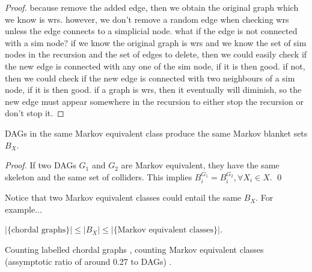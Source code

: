 \begin{proof}
because remove the added edge, then we obtain the original graph which we know is wrs. however, we don't remove a random edge when checking wrs unless the edge connects to a simplicial node. what if the edge is not connected with a sim node? if we know the original graph is wrs and we know the set of sim nodes in the recursion and the set of edges to delete, then we could easily check if the new edge is connected with any one of the sim node, if it is then good. if not, then we could check if the new edge is connected with two neighbours of a sim node, if it is then good. if a graph is wrs, then it eventually will diminish, so the new edge must appear somewhere in the recursion to either stop the recursion or don't stop it.
\end{proof} 

\begin{corollary}
DAGs in the same Markov equivalent class produce the same Markov blanket sets $B_X$. 
\end{corollary}
\begin{proof}
If two DAGs $G_1$ and $G_2$ are Markov equivalent, they have the same skeleton and the same set of colliders. This implies $B_i^{G_1} = B_i^{G_2}, \forall X_i \in X$. \qed
\end{proof}
Notice that two Markov equivalent classes could entail the same $B_X$. For example... 

\begin{corollary}
$|\{\text{chordal graphs}\}| \le |B_X| \le |\{\text{Markov equivalent classes}\}|$.
\end{corollary} 

Counting labelled chordal graphs \cite{wormald1985counting}, counting Markov equivalent classes (assymptotic ratio of around 0.27 to DAGs) \cite{gillispie2001enumerating}. 

